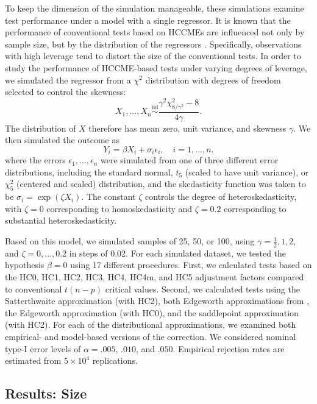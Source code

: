 \documentclass[12pt]{article}\usepackage[]{graphicx}\usepackage[]{color}
\newcommand{\iid}{\stackrel{\text{iid}}{\sim}}
\begin{document}
To keep the dimension of the simulation manageable, these simulations examine test performance under a model with a single regressor. 
It is known that the performance of conventional tests based on HCCMEs are influenced not only by sample size, but by the distribution of the regressors \citep{Chesher1991finite, Cribari-Neto2004asymptotic, Kauermann2001note}. 
Specifically, observations with high leverage tend to distort the size of the conventional tests. 
In order to study the performance of HCCME-based tests under varying degrees of leverage, we simulated the regressor from a $\chi^2$ distribution with degrees of freedom selected to control the skewness:
\[
X_1,...,X_n \iid \frac{\gamma^2 \chi^2_{8 / \gamma^2} - 8 }{4 \gamma}.
\]
The distribution of $X$ therefore has mean zero, unit variance, and skewness $\gamma$. We then simulated the outcome as 
\[
Y_i = \beta X_i + \sigma_i \epsilon_i, \quad i = 1,...,n.
\]
where the errors $\epsilon_1,...,\epsilon_n$ were simulated from one of three different error distributions, including the standard normal, $t_5$ (scaled to have unit variance), or $\chi^2_5$ (centered and scaled) distribution, and the skedasticity function was taken to be $\sigma_i = \exp(\zeta X_i)$. The constant $\zeta$ controls the degree of heteroskedasticity, with $\zeta = 0$ corresponding to homoskedasticity and $\zeta = 0.2$ corresponding to substantial heteroskedasticity. 

Based on this model, we simulated samples of 25, 50, or 100, using $\gamma = \frac{1}{2},1,2$, and $\zeta = 0,...,0.2$ in steps of 0.02. For each simulated dataset, we tested the hypothesis $\beta = 0$ using 17 different procedures. First, we calculated tests based on the HC0, HC1, HC2, HC3, HC4, HC4m, and HC5 adjustment factors compared to conventional $t(n - p)$ critical values. Second, we calculated tests using the Satterthwaite approximation (with HC2), both Edgeworth approximations from \citet[][also using HC2]{Kauermann2001note}, the \citet{Rothenberg1988approximate} Edgeworth approximation (with HC0), and the saddlepoint approximation (with HC2). For each of the distributional approximations, we examined both empirical- and model-based versions of the correction. We considered nominal type-I error levels of $\alpha = .005$, $.010$, and $.050$. Empirical rejection rates are estimated from \ensuremath{5\times 10^{4}} replications.

\subsection{Results: Size}
\end{document}
